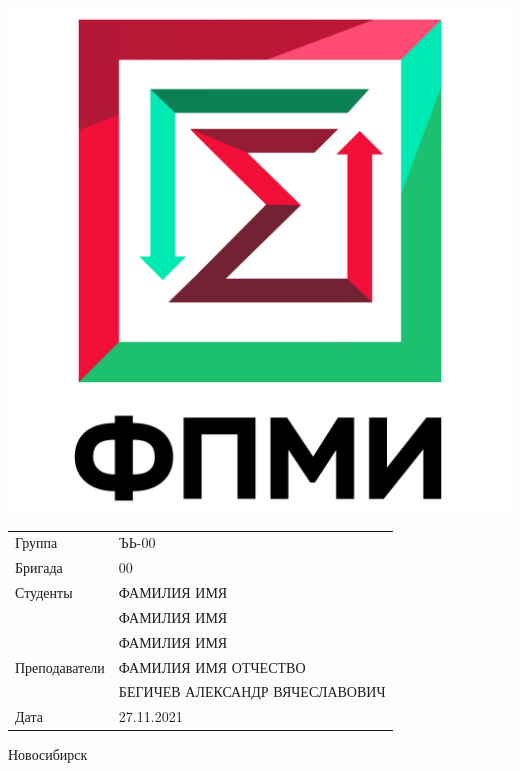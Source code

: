 \documentclass[12pt,a4paper]{article}
\begin{document}
\begin{center}
\begin{minipage}{0.3 \textwidth}
	\includegraphics[scale=0.22]{pic/fami_emblem}
\end{minipage}%
\hfill
\begin{minipage}{0.7 \textwidth}
	\begin{flushleft}
	
	\renewcommand{\arraystretch}{1.4}
	\begin{tabular}{ll}
		Группа			& ЪЬ-00 \\
		Бригада			& 00 \\

		Студенты		& \uppercase{Фамилия Имя} \\
						& \uppercase{Фамилия Имя} \\
						& \uppercase{Фамилия Имя} \\
	
		Преподаватели	& \uppercase{Фамилия Имя Отчество} \\
						& \uppercase{Бегичев Александр Вячеславович} \\
	
		Дата			& 27.11.2021
	\end{tabular}
	\renewcommand{\arraystretch}{1.0}
	
	\end{flushleft}
\end{minipage}%

\begin{Large}

\vspace{24mm}

Новосибирск \\

\end{Large}
\end{center}

\newpage
\end{document}

